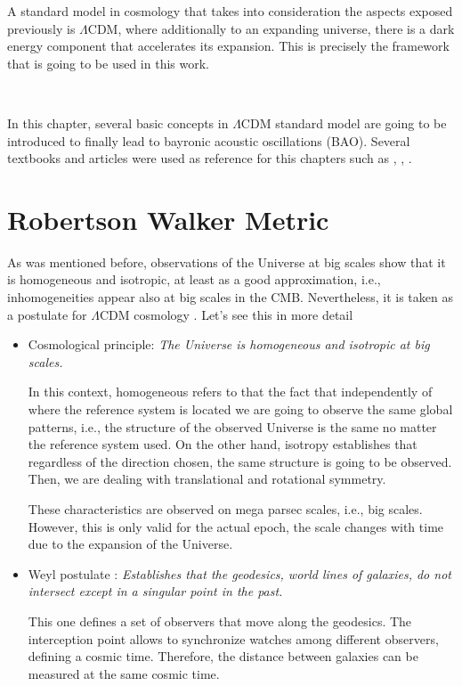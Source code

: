 A standard model in cosmology that takes into consideration the aspects exposed previously is 
$\Lambda$CDM, where additionally to an expanding universe, there is a dark energy component that accelerates its expansion. This is precisely the framework that is going to be used in this work. 

\

In this chapter, several basic concepts in $\Lambda$CDM standard model are going to 
be introduced to finally lead to bayronic acoustic oscillations (BAO). Several textbooks and
articles were used as reference for this chapters such as \cite{Longair}, \cite{bosch},
\cite{padma}. 



\section{ Robertson Walker Metric}

As was mentioned before, observations of the Universe at big scales show 
that it is homogeneous and isotropic, at least as a good approximation, i.e., 
inhomogeneities appear also at big scales in the CMB. Nevertheless, it is taken
as a postulate for $\Lambda$CDM cosmology . Let's see this in more detail

\begin{itemize}
\item Cosmological principle: \emph{ The Universe is homogeneous and isotropic 
at big scales.}


In this context, homogeneous refers to that the fact that independently of 
where the reference system is located we are going to observe the same global 
patterns, i.e., the structure of the observed Universe is the same no matter 
the reference system used.
On the other hand, isotropy establishes that regardless of the direction chosen, 
the same structure is going to be observed. Then, we are dealing with translational
and rotational symmetry. 

These characteristics are observed on mega parsec scales, i.e., big scales. 
However, this is only valid for the actual epoch, the scale changes with time due 
to the expansion of the Universe. 


\item Weyl postulate :\emph{ Establishes that the geodesics, world lines of 
galaxies, do not intersect except in a singular point in the past.} 

This one defines a set of observers that move along the geodesics. 
The interception point allows to synchronize watches among different observers,
defining a cosmic time. Therefore, the distance between galaxies can
be measured at the same cosmic time. 

\end{itemize} 

